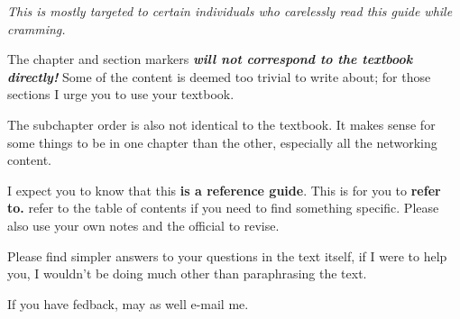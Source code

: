 \documentclass[../main.tex]{subfiles}
\begin{document}
\textit{This is mostly targeted to certain individuals who carelessly read this guide while cramming.}

\enumerate
    \item The chapter and section markers \textbf{\textit{will not correspond to the textbook directly!}} Some of the content is deemed too trivial to write about; for those sections I urge you to use your textbook.
    \item The subchapter order is also not identical to the textbook. It makes sense for some things to be in one chapter than the other, especially all the networking content.
    \item I expect you to know that this \textbf{is a reference guide}. This is for you to \textbf{refer to.} refer to the table of contents if you need to find something specific. Please also use your own notes and the official to revise.
    \item Please find simpler answers to your questions in the text itself, if I were to help you, I wouldn't be doing much other than paraphrasing the text.
    \item If you have fedback, may as well e-mail me.
\endenumerate
\end{document}
